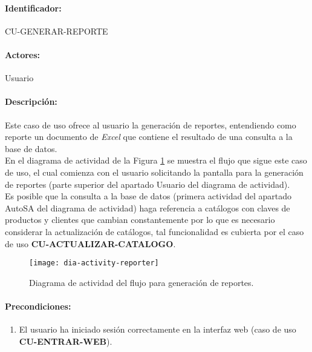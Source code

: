 \paragraph{Identificador:}
CU-GENERAR-REPORTE
\paragraph{Actores:}
Usuario
\paragraph{Descripción:}
Este caso de uso ofrece al usuario la generación de reportes, entendiendo como reporte un documento de \textit{Excel}\textsuperscript{\textcopyright} que contiene el resultado de una consulta a la base de datos.\\
En el diagrama de actividad de la Figura \ref{fig:dia-activity-reporter} se muestra el flujo que sigue este caso de uso, el cual comienza con el usuario solicitando la pantalla para la generación de reportes (parte superior del apartado Usuario del diagrama de actividad).\\
Es posible que la consulta a la base de datos (primera actividad del apartado AutoSA del diagrama de actividad) haga referencia a catálogos con claves de productos y clientes que cambian constantemente por lo que es necesario considerar la actualización de catálogos, tal funcionalidad es cubierta por el caso de uso \textbf{CU-ACTUALIZAR-CATALOGO}.
\begin{figure}[h]
  \centering
  \texttt{[image: dia-activity-reporter]}
  \caption{Diagrama de actividad del flujo para generación de reportes.}
  \label{fig:dia-activity-reporter}
\end{figure}
\paragraph{Precondiciones:}
\begin{enumerate}
  \item El usuario ha iniciado sesión correctamente en la interfaz web (caso de uso \textbf{CU-ENTRAR-WEB}).
\end{enumerate}

